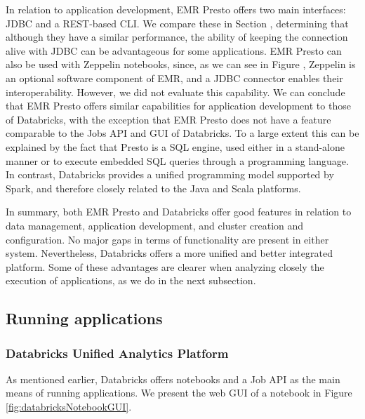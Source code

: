 In relation to application development, EMR Presto offers two main interfaces: JDBC and a REST-based CLI. We compare these in Section \label{prestoJDBvsCLI}, determining that although they have a similar performance, the ability of keeping the connection alive with JDBC can be advantageous for some applications. EMR Presto can also be used with Zeppelin notebooks, since, as we can see in Figure \label{fig:emrClusterCreationGUI}, Zeppelin is an optional software component of EMR, and a JDBC connector enables their interoperability. However, we did not evaluate this capability. We can conclude that EMR Presto offers similar capabilities for application development to those of Databricks, with the exception that EMR Presto does not have a feature comparable to the Jobs API and GUI of Databricks. To a large extent this can be explained by the fact that Presto is a SQL engine, used either in a stand-alone manner or to execute embedded SQL queries through a programming language. In contrast, Databricks provides a unified programming model supported by Spark, and therefore closely related to the Java and Scala platforms.

In summary, both EMR Presto and Databricks offer good features in relation to data management, application development, and cluster creation and configuration. No major gaps in terms of functionality are present in either system. Nevertheless, Databricks offers a more unified and better integrated platform. Some of these advantages are clearer when analyzing closely the execution of applications, as we do in the next subsection.

\subsection{Running applications}
\subsubsection{Databricks Unified Analytics Platform}\label{runningApplicationsDatabricks}

As mentioned earlier, Databricks offers notebooks and a Job API as the main means of running applications. We present the web GUI of a notebook in Figure \ref{fig:databricksNotebookGUI}.

